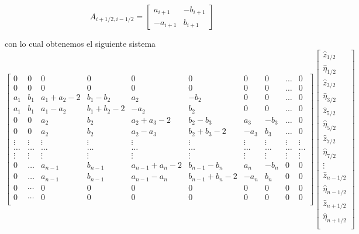 \documentclass[]{article}%
\newcommand{\hz}{\hat{z}}
\newcommand{\heta}{\hat{\eta}}
\begin{document}
\begin{equation}
A_{i+1/2,i-1/2}=\begin{bmatrix}
a_{i+1} & -b_{i+1} \\
-a_{i+1} & b_{i+1} 
\end{bmatrix}
\end{equation}

con lo cual obtenemos el siguiente sistema 
\begin{equation}
\begin{bmatrix}
0  & 0 &0 &0 &0 &0 & 0 &0&\dots &0  \\
0  & 0 &0 &0 &0 &0 &0&0& \dots &0  \\
a_1&b_1&a_1+a_2-2& b_1-b_2& a_2 & -b_2&0&0&\dots &0 \\
a_1&b_1&a_1-a_2& b_1+b_2-2&-a_2 &b_2&0&0&\dots &0 \\
0&0&a_2&b_2&a_2+a_3-2& b_2-b_3& a_3 & -b_3&\dots &0 \\
0&0&a_2&b_2&a_2-a_3& b_2+b_3-2&-a_3 &b_3&\dots &0 \\
\vdots  & \vdots &\vdots &\vdots &\vdots &\vdots & \vdots &\vdots &\vdots &\vdots  \\
\dots  & \dots &\dots &\dots &\dots &\dots & \dots &\dots &\dots &\dots  \\
\vdots  & \vdots &\vdots &\vdots &\vdots &\vdots & \vdots &\vdots &\vdots &\vdots  \\
0&\dots  &a_{n-1}&b_{n-1}&a_{n-1}+a_n-2& b_{n-1}-b_n& a_n & -b_n & 0 & 0 \\
0&\dots  &a_{n-1}&b_{n-1}&a_{n-1}-a_n& b_{n-1}+b_n-2&-a_n &b_n & 0 & 0 \\
0  & \cdots &0 &0 &0 &0 & 0 &0&0 &0  \\
0  & \cdots &0 &0 &0 &0 &0&0& 0 &0  \\
\end{bmatrix}
\begin{bmatrix}
\hz_{1/2} \\ \heta_{1/2} \\
\hz_{3/2} \\ \heta_{3/2} \\
\hz_{5/2} \\ \heta_{5/2} \\
\hz_{7/2} \\ \heta_{7/2} \\
\vdots \\ %
\hz_{n-1/2} \\ \heta_{n-1/2} \\
\hz_{n+1/2} \\ \heta_{n+1/2} \\

\end{bmatrix}
\end{equation}
\end{document}
